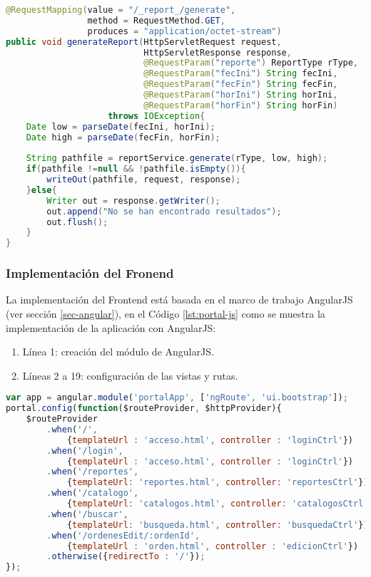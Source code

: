 \begin{enumerate}
\begin{lstlisting}[language=Java, caption={Servicio Web para generar un reporte.}, captionpos=b, label={lst:report-controller-gen}]
@RequestMapping(value = "/_report_/generate",
				method = RequestMethod.GET,
				produces = "application/octet-stream")
public void generateReport(HttpServletRequest request,
						   HttpServletResponse response,
						   @RequestParam("reporte") ReportType rType,
						   @RequestParam("fecIni") String fecIni,
						   @RequestParam("fecFin") String fecFin,
						   @RequestParam("horIni") String horIni,
						   @RequestParam("horFin") String horFin)
					throws IOException{
	Date low = parseDate(fecIni, horIni);
	Date high = parseDate(fecFin, horFin);
	
	String pathfile = reportService.generate(rType, low, high);
	if(pathfile !=null && !pathfile.isEmpty()){
		writeOut(pathfile, request, response);
	}else{
		Writer out = response.getWriter();
		out.append("No se han encontrado resultados");
		out.flush();
	}
}
\end{lstlisting}

\end{enumerate}


\subsubsection{Implementación del Fronend}
La implementación del Frontend está basada en el marco de trabajo AngularJS (ver sección \ref{sec-angular}), en el Código \ref{lst:portal-js} como se muestra la implementación de la aplicación con AngularJS:
\begin{enumerate}
	\item Línea 1: creación del módulo de AngularJS.
	\item Líneas 2 a 19: configuración de las vistas y rutas.
\end{enumerate}
\begin{lstlisting}[language=Javascript, caption={Módulo de AngularJS para el portalWeb}, captionpos=b, label={lst:portal-js}]
var app = angular.module('portalApp', ['ngRoute', 'ui.bootstrap']);
portal.config(function($routeProvider, $httpProvider){
	$routeProvider
		.when('/',
			{templateUrl : 'acceso.html', controller : 'loginCtrl'})
		.when('/login',
			{templateUrl : 'acceso.html', controller : 'loginCtrl'})
		.when('/reportes',
			{templateUrl: 'reportes.html', controller: 'reportesCtrl'})
		.when('/catalogo',
			{templateUrl: 'catalogos.html', controller: 'catalogosCtrl'})
		.when('/buscar',
			{templateUrl: 'busqueda.html', controller: 'busquedaCtrl'})
		.when('/ordenesEdit/:ordenId',
			{templateUrl : 'orden.html', controller : 'edicionCtrl'})
		.otherwise({redirectTo : '/'});
});
\end{lstlisting}

